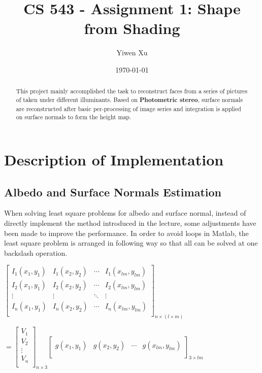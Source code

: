 \documentclass[a4paper]{article}
\title{CS 543 - Assignment 1: Shape from Shading }
\author{Yiwen Xu}
\date{\today}
\begin{document}
\maketitle

\begin{abstract}
This project mainly accomplished the task to reconstruct faces from a series of pictures of taken under different illuminants. Based on \textbf{Photometric stereo},
surface normals are reconstructed after basic per-processing of image series and integration is applied on surface normals to form the height map.
\end{abstract}

\section{Description of Implementation}
\label{sec:introduction}

\subsection{Albedo and Surface Normals Estimation}
When solving least square problems for albedo and surface normal, instead of directly implement the method introduced in the lecture, some adjustments have been made to improve the performance. In order to avoid loops in Matlab, the least square problem is arranged in following way so that all can be solved at one backslash operation.
\begin{flushleft}
$
\begin{bmatrix}
    I_{1}(x_{1},y_{1}) & I_{1}(x_{2},y_{2}) & \cdots  & I_{1}(x_{lm},y_{lm}) \\
    I_{2}(x_{1},y_{1}) & I_{2}(x_{2},y_{2}) & \cdots  & I_{2}(x_{lm},y_{lm}) \\
    \vdots 			   & \vdots  			& \ddots  & \vdots			     \\
    I_{n}(x_{1},y_{1}) & I_{n}(x_{2},y_{2}) & \cdots  & I_{n}(x_{lm},y_{lm}) \\
\end{bmatrix}_{n \times (l \times m)}
$
\end{flushleft}

\begin{flushright}
$
=\begin{bmatrix}
    V_{1} \\
    V_{2} \\
    \vdots\\ 
    V_{n} \\ 
\end{bmatrix}_{n \times 3}
\begin{bmatrix}
	g(x_{1},y_{1}) & g(x_{2},y_{2}) & \cdots & g(x_{lm},y_{lm}) \\ 
\end{bmatrix}_{3 \times lm}
$
\end{flushright}
\end{document}
